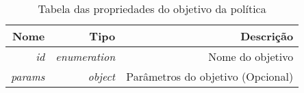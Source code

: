 \begin{table}[!htb]
    \centering
    \caption[resource-objective-shape]{Tabela das propriedades do objetivo da política
    \label{tab:objective-shape}}
    \begin{tabular}{rrr}
        \toprule
            Nome & Tipo & Descrição \\ 
        \midrule
            \textit{id} & \textit{enumeration} & Nome do objetivo \\
            \textit{params} & \textit{object} & Parâmetros do objetivo (Opcional) \\
        \bottomrule
    \end{tabular}
\end{table}

